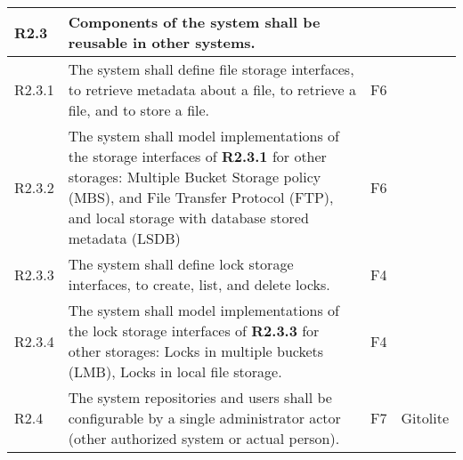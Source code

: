 \begin{landscape}
\begin{longtable}{|p{1cm}|p{19cm}|p{2cm}|p{3cm}|}
        \rowcolor[HTML]{DDDDDD}        R2.3       & Components of the system shall be reusable in other systems.                                                                                                                                                                                                                          &                       &                                          \\ \hline
        \rowcolor[HTML]{EEFFEE}        R2.3.1     & The system shall define file storage interfaces, to retrieve metadata about a file, to retrieve a file, and to store a file.                                                                                                                                                          & F6                    &                                          \\\hline
        \rowcolor[HTML]{FFEEEE}        R2.3.2     & The system shall model implementations of the storage interfaces of \textbf{R2.3.1} for other storages: Multiple Bucket Storage policy (MBS), and File Transfer Protocol (FTP), and local storage with database stored metadata (LSDB)                                                & F6                    &                                          \\\hline
        \rowcolor[HTML]{FFEEEE}        R2.3.3     & The system shall define lock storage interfaces, to create, list, and delete locks.                                                                                                                                                                                                   & F4                    &                                          \\\hline
        \rowcolor[HTML]{FFEEEE}        R2.3.4     & The system shall model implementations of the lock storage interfaces of \textbf{R2.3.3} for other storages: Locks in multiple buckets (LMB), Locks in local file storage.                                                                                                            & F4                    &                                          \\\hline
        \rowcolor[HTML]{DDFFDD}        R2.4       & The system repositories and users shall be configurable by a single administrator actor (other authorized system or actual person).                                                                                                                                                   & F7                    & Gitolite                                 \\ \hline

\end{longtable}
\end{landscape}
